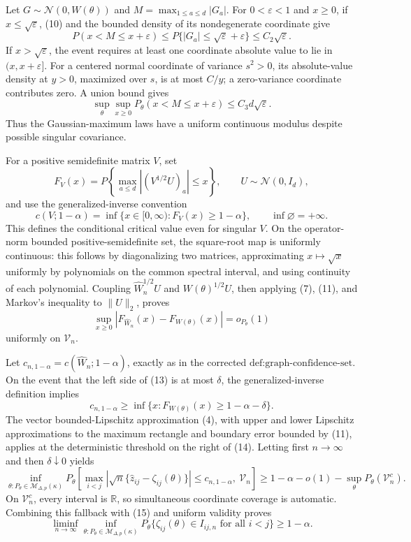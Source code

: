 Let \(G\sim\mathcal N(0,W(\theta))\) and \(M=\max_{1\leq a\leq d}|G_a|\).  For \(0<\varepsilon<1\) and \(x\geq0\), if \(x\leq\sqrt\varepsilon\), (10) and the bounded density of its nondegenerate coordinate give
\[
 P(x<M\leq x+\varepsilon)
 \leq P\{|G_a|\leq\sqrt\varepsilon+\varepsilon\}
 \leq C_2\sqrt\varepsilon.
\]
If \(x>\sqrt\varepsilon\), the event requires at least one coordinate absolute value to lie in \((x,x+\varepsilon]\).  For a centered normal coordinate of variance \(s^2>0\), its absolute-value density at \(y>0\), maximized over \(s\), is at most \(C/y\); a zero-variance coordinate contributes zero.  A union bound gives
\[
 \sup_{\theta}\sup_{x\geq0}P_\theta(x<M\leq x+\varepsilon)
 \leq C_3d\sqrt\varepsilon.
\tag{11}
\]
Thus the Gaussian-maximum laws have a uniform continuous modulus despite possible singular covariance.

For a positive semidefinite matrix \(V\), set
\[
 F_V(x)=P\!\left\{\max_{a\leq d}|(V^{1/2}U)_a|\leq x\right\},
 \qquad U\sim\mathcal N(0,I_d),
\]
and use the generalized-inverse convention
\[
 c(V;1-\alpha)=\inf\{x\in[0,\infty):F_V(x)\geq1-\alpha\},
 \qquad \inf\varnothing=+\infty.
\tag{12}
\]
This defines the conditional critical value even for singular \(V\).  On the operator-norm bounded positive-semidefinite set, the square-root map is uniformly continuous: this follows by diagonalizing two matrices, approximating \(x\mapsto\sqrt x\) uniformly by polynomials on the common spectral interval, and using continuity of each polynomial.  Coupling \(\widehat W_n^{1/2}U\) and \(W(\theta)^{1/2}U\), then applying (7), (11), and Markov's inequality to \(\lVert U\rVert_2\), proves
\[
 \sup_{x\geq0}|F_{\widehat W_n}(x)-F_{W(\theta)}(x)|=o_{P_\theta}(1)
\tag{13}
\]
uniformly on \(\mathcal V_n\).

Let \(c_{n,1-\alpha}=c(\widehat W_n;1-\alpha)\), exactly as in the corrected \(\text{def:graph-confidence-set}\).  On the event that the left side of (13) is at most \(\delta\), the generalized-inverse definition implies
\[
 c_{n,1-\alpha}\geq
 \inf\{x:F_{W(\theta)}(x)\geq1-\alpha-\delta\}.
\tag{14}
\]
The vector bounded-Lipschitz approximation (4), with upper and lower Lipschitz approximations to the maximum rectangle and boundary error bounded by (11), applies at the deterministic threshold on the right of (14).  Letting first \(n\to\infty\) and then \(\delta\downarrow0\) yields
\[
 \inf_{\theta:P_\theta\in\mathcal M_{\Delta,p}(\kappa)}
 P_\theta\!\left[
 \max_{i<j}\left|\sqrt n\{\widehat z_{ij}-\zeta_{ij}(\theta)\}\right|
 \leq c_{n,1-\alpha},\ \mathcal V_n\right]
 \geq1-\alpha-o(1)-\sup_\theta P_\theta(\mathcal V_n^c).
\tag{15}
\]
On \(\mathcal V_n^c\), every interval is \(\mathbb R\), so simultaneous coordinate coverage is automatic.  Combining this fallback with (15) and uniform validity proves
\[
 \liminf_{n\to\infty}\inf_{\theta:P_\theta\in\mathcal M_{\Delta,p}(\kappa)}
 P_\theta\{\zeta_{ij}(\theta)\in I_{ij,n}\text{ for all }i<j\}
 \geq1-\alpha.
\tag{16}
\]

